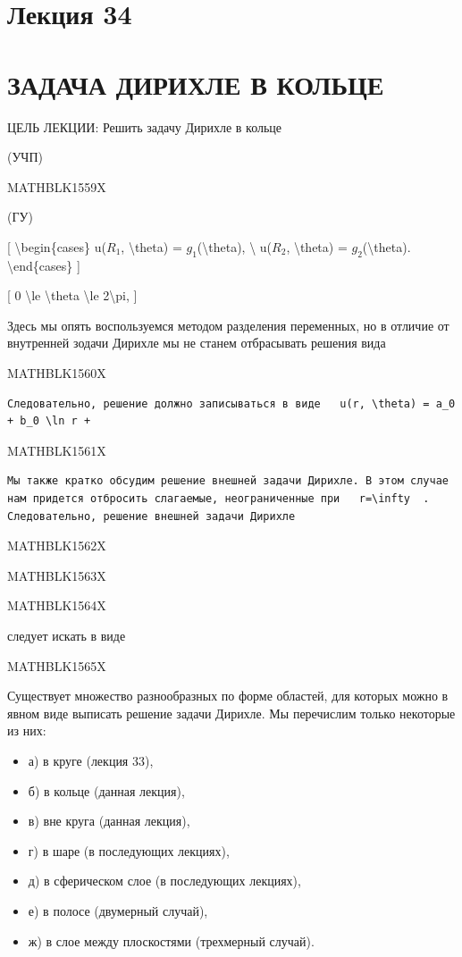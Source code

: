 \documentclass[
]{article}
\begin{document}
{{{\section{Лекция 34}\label{ux43bux435ux43aux446ux438ux44f-34}

\section{ЗАДАЧА ДИРИХЛЕ В
КОЛЬЦЕ}\label{ux437ux430ux434ux430ux447ux430-ux434ux438ux440ux438ux445ux43bux435-ux432-ux43aux43eux43bux44cux446ux435}

ЦЕЛЬ ЛЕКЦИИ: Решить задачу Дирихле в кольце

(УЧП)

MATHBLK1559X

(ГУ)

{[} \textbackslash begin\{cases\} u(\(R_1\), \textbackslash theta) =
\(g_1\)(\textbackslash theta), \textbackslash{} u(\(R_2\),
\textbackslash theta) = \(g_2\)(\textbackslash theta).
\textbackslash end\{cases\} {]}

{[} 0 \textbackslash le \textbackslash theta \textbackslash le
2\textbackslash pi, {]}

Здесь мы опять воспользуемся методом разделения переменных, но в отличие
от внутренней зодачи Дирихле мы не станем отбрасывать решения вида

MATHBLK1560X

\begin{verbatim}
Следовательно, решение должно записываться в виде   u(r, \theta) = a_0 + b_0 \ln r + 
\end{verbatim}

MATHBLK1561X

\begin{verbatim}
Мы также кратко обсудим решение внешней задачи Дирихле. В этом случае нам придется отбросить слагаемые, неограниченные при   r=\infty  . Следовательно, решение внешней задачи Дирихле
\end{verbatim}

MATHBLK1562X

MATHBLK1563X

MATHBLK1564X

следует искать в виде

MATHBLK1565X

Существует множество разнообразных по форме областей, для которых можно
в явном виде выписать решение задачи Дирихле. Мы перечислим только
некоторые из них:

\begin{itemize}
\item
  а) в круге (лекция 33),
\item
  б) в кольце (данная лекция),
\item
  в) вне круга (данная лекция),
\item
  г) в шаре (в последующих лекциях),
\item
  д) в сферическом слое (в последующих лекциях),
\item
  е) в полосе (двумерный случай),
\item
  ж) в слое между плоскостями (трехмерный случай).
\end{itemize}

}}}
\end{document}
